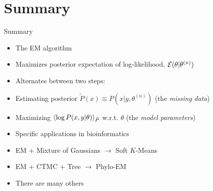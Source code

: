 \documentclass{beamer}
\begin{document}
\section*{Summary}

\begin{frame}{Summary}

  \begin{itemize}
  \item The EM algorithm
   \itemb
   \item Maximizes posterior expectation of log-likelihood, ${\cal E}(\theta|\theta^{(n)})$
   \item Alternates between two steps:
   \itemb
    \item \alert{E}stimating posterior $\tilde{P}(x) \equiv P(x|y,\theta^{(n)})$ (the \alert{\em missing data})
    \item \alert{M}aximizing $\langle \log P(x,y|\theta) \rangle_{\tilde{P}}$ w.r.t. $\theta$ (the \alert{\em model parameters})
   \iteme
   \iteme
  \item Specific applications in bioinformatics
   \itemb
   \item EM + Mixture of Gaussians $\to$ Soft $K$-Means
   \item EM + CTMC + Tree $\to$ Phylo-EM
   \item There are many others
   \iteme
  \end{itemize}

\end{frame}
\end{document}
